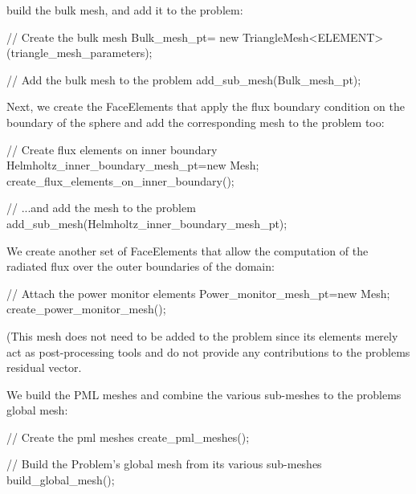 build the bulk mesh, and add it to the problem\+:

 
\begin{DoxyCodeInclude}
 \textcolor{comment}{// Create the bulk mesh}
 Bulk\_mesh\_pt= \textcolor{keyword}{new} TriangleMesh<ELEMENT>(triangle\_mesh\_parameters);

 \textcolor{comment}{// Add the bulk mesh to the problem}
 add\_sub\_mesh(Bulk\_mesh\_pt);

\end{DoxyCodeInclude}


Next, we create the Face\+Elements that apply the flux boundary condition on the boundary of the sphere and add the corresponding mesh to the problem too\+:


\begin{DoxyCodeInclude}
  \textcolor{comment}{// Create flux elements on inner boundary}
 Helmholtz\_inner\_boundary\_mesh\_pt=\textcolor{keyword}{new} Mesh;
 create\_flux\_elements\_on\_inner\_boundary();

 \textcolor{comment}{// ...and add the mesh to the problem}
 add\_sub\_mesh(Helmholtz\_inner\_boundary\_mesh\_pt);

\end{DoxyCodeInclude}


We create another set of Face\+Elements that allow the computation of the radiated flux over the outer boundaries of the domain\+:


\begin{DoxyCodeInclude}
 \textcolor{comment}{// Attach the power monitor elements}
 Power\_monitor\_mesh\_pt=\textcolor{keyword}{new} Mesh;
 create\_power\_monitor\_mesh();

\end{DoxyCodeInclude}


(This mesh does not need to be added to the problem since its elements merely act as post-\/processing tools and do not provide any contributions to the problem\textquotesingle{}s residual vector.

We build the P\+ML meshes and combine the various sub-\/meshes to the problem\textquotesingle{}s global mesh\+:

 
\begin{DoxyCodeInclude}
 \textcolor{comment}{// Create the pml meshes}
 create\_pml\_meshes();

 \textcolor{comment}{// Build the Problem's global mesh from its various sub-meshes}
 build\_global\_mesh();

\end{DoxyCodeInclude}


